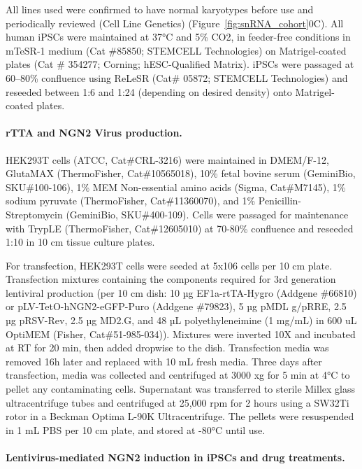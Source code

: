 All lines used were confirmed to have normal karyotypes before use and periodically reviewed (Cell Line Genetics) (Figure~\ref{fig:snRNA_cohort}0C). All human iPSCs were maintained at 37°C and 5\% CO2, in feeder-free conditions in mTeSR-1 medium (Cat \#85850; STEMCELL Technologies) on Matrigel-coated plates (Cat \# 354277; Corning; hESC-Qualified Matrix). iPSCs were passaged at 60–80\% confluence using ReLeSR (Cat\# 05872; STEMCELL Technologies) and reseeded between 1:6 and 1:24 (depending on desired density) onto Matrigel-coated plates.

\paragraph{rTTA and NGN2 Virus production.}
HEK293T cells (ATCC, Cat\#CRL-3216) were maintained in DMEM/F-12, GlutaMAX (ThermoFisher, Cat\#10565018), 10\% fetal bovine serum (GeminiBio, SKU\#100-106), 1\% MEM Non-essential amino acids (Sigma, Cat\#M7145), 1\% sodium pyruvate (ThermoFisher, Cat\#11360070), and 1\% Penicillin-Streptomycin (GeminiBio, SKU\#400-109). Cells were passaged for maintenance with TrypLE (ThermoFisher, Cat\#12605010) at 70-80\% confluence and reseeded 1:10 in 10 cm tissue culture plates.

For transfection, HEK293T cells were seeded at 5x106 cells per 10 cm plate. Transfection mixtures containing the components required for 3rd generation lentiviral production (per 10 cm dish: 10 µg EF1a-rtTA-Hygro (Addgene \#66810) or pLV-TetO-hNGN2-eGFP-Puro (Addgene \#79823), 5 µg pMDL g/pRRE, 2.5 µg pRSV-Rev, 2.5 µg MD2.G, and 48 µL polyethyleneimine (1 mg/mL) in 600 uL OptiMEM (Fisher, Cat\#51-985-034)). Mixtures were inverted 10X and incubated at RT for 20 min, then added dropwise to the dish. Transfection media was removed 16h later and replaced with 10 mL fresh media. Three days after transfection, media was collected and centrifuged at 3000 xg for 5 min at 4°C to pellet any contaminating cells. Supernatant was transferred to sterile Millex glass ultracentrifuge tubes and centrifuged at 25,000 rpm for 2 hours using a SW32Ti rotor in a Beckman Optima L-90K Ultracentrifuge. The pellets were resuspended in 1 mL PBS per 10 cm plate, and stored at -80°C until use.

\paragraph{Lentivirus-mediated NGN2 induction in iPSCs and drug treatments.}

